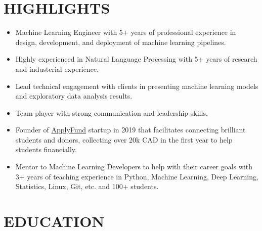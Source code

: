 \documentclass[11pt,a4paper,sans]{moderncv} %
\begin{document}
	
	\makecvtitle
	

    \section{HIGHLIGHTS}
    \begin{itemize}
        \item Machine Learning Engineer with 5+ years of professional experience in design, development, and deployment of machine learning pipelines.
        \item Highly experienced in Natural Language Processing with 5+ years of research and industerial experience.
        \item Lead technical engagement with clients in presenting machine learning models and exploratory data analysis results.
        \item Team-player with strong communication and leadership skills.
        \item Founder of \href{https://www.apply-blog.com/applyfund/}{ApplyFund} startup in 2019 that facilitates connecting brilliant students and donors, collecting over 20k CAD in the first year to help students financially.
        \item Mentor to Machine Learning Developers to help with their career goals with 3+ years of teaching experience in Python, Machine Learning, Deep Learning, Statistics, Linux, Git, etc. and 100+ students.
    \end{itemize}
	
	\section{EDUCATION}
\end{document}
